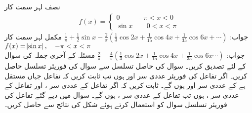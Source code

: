 \quad نصف لہر سمت کار
\begin{align*}
f(x)=
\begin{cases}
0& -\pi<x<0\\
\sin x&\phantom{-} 0<x<\pi
\end{cases}
\end{align*}
جواب:\quad
$\tfrac{1}{\pi}+\frac{1}{2}\sin x-\tfrac{2}{\pi}(\frac{1}{3}\cos 2x+\tfrac{1}{15}\cos 4x+\tfrac{1}{35}\cos 6x+\cdots)$
\quad مکمل لہر سمت کار
$f(x)=\abs{\sin x},\quad  -\pi<x<\pi$\\
جواب:\quad
$\tfrac{2}{\pi}-\tfrac{4}{\pi}(\tfrac{1}{3}\cos 2x+\tfrac{1}{15}\cos 4x+\frac{1}{35}\cos 6x\cdots)$
\quad مسئلہ  کے آخری جملہ کی سوال  کے لئے  تصدیق کریں۔ 
\quad سوال  کی حاصل تسلسل سے سوال  کی فوریئر تسلسل حاصل کریں۔
\quad اگر تفاعل  کی فوریئر عددی سر  اور  ہوں تب ثابت کریں کہ تفاعل  جہاں  مستقل ہے کے عددی سر
 اور  ہوں گے۔
\quad ثابت کریں کہ اگر تفاعل  کے عددی سر ،  اور تفاعل  کے عددی سر ،  ہوں تب تفاعل  کے عددی سر ،  ہوں گے۔
\quad سوال  میں دیے گئے تفاعل کی فوریئر تسلسل سوال  کو استعمال کرتے ہوئے شکل  کی نتائج سے  حاصل کریں۔

